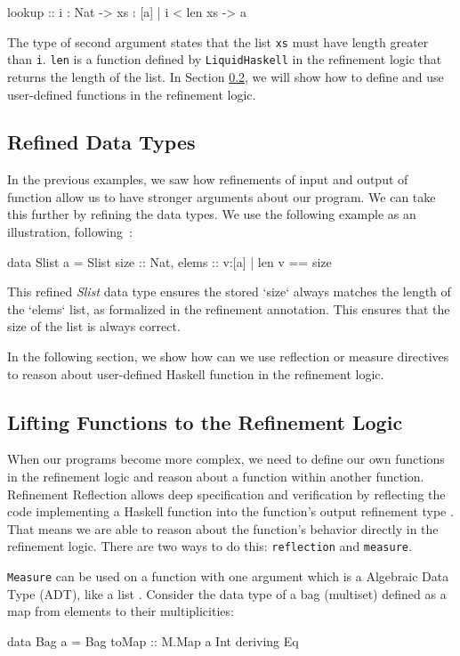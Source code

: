 \begin{code}
	lookup :: i : Nat -> xs : {[a] | i < len xs} -> a
\end{code}

The type of second argument states that the list \texttt{xs} must have length greater than \texttt{i}.
\texttt{len} is a function defined by \texttt{LiquidHaskell} in the refinement logic that returns the length of the list.
In Section \ref{sec:reflection}, we will show how to define and use user-defined functions in the refinement logic.

\subsection{Refined Data Types}
In the previous examples, we saw how refinements of input and output of function allow us to have stronger arguments about our program.
We can take this further by refining the data types.
We use the following example as an illustration, following~\cite{jhala2020}:
\begin{code}
data Slist a = Slist { 
  size :: Nat, 
  elems :: {v:[a] | len v == size} 
  }
\end{code}

This refined \textit{Slist} data type ensures the stored `size` always matches the length of the `elems` list,
as formalized in the refinement annotation.
This ensures that the size of the list is always correct.

In the following section, we show how can we use reflection or measure directives to reason about user-defined Haskell function in the refinement logic.

\subsection{Lifting Functions to the Refinement Logic}
\label{sec:reflection}
When our programs become more complex, we need to define our own functions in the refinement logic and reason about
a function within another function. Refinement Reflection allows deep specification and verification by
reflecting the code implementing a Haskell function into the function’s output refinement type \cite{vazou2018}.
That means we are able to reason about the function's behavior directly in the refinement logic.
There are two ways to do this: \texttt{reflection} and \texttt{measure}.

\texttt{Measure} can be used on a function with one argument which is a Algebraic Data Type (ADT), like a list \cite{niki_lecture_2024}.
Consider the data type of a bag (multiset) defined as a map from elements to their multiplicities:
\begin{code}
	data Bag a = Bag { toMap :: M.Map a Int } deriving Eq
\end{code}

